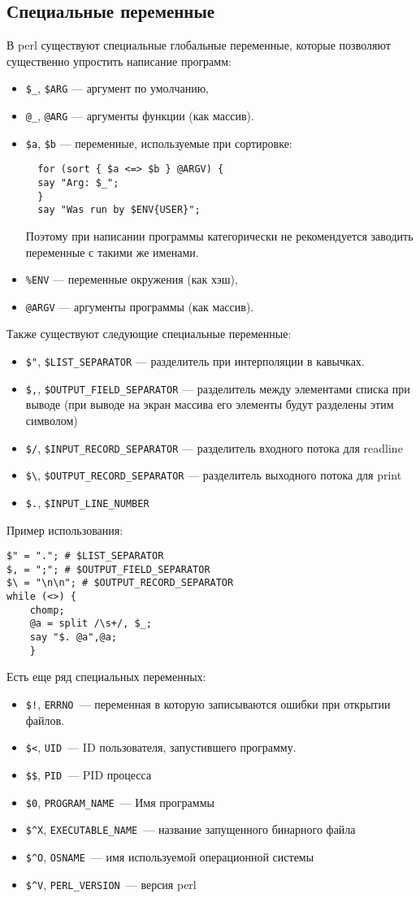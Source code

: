 \subsection{Специальные переменные}
В perl существуют специальные глобальные переменные, которые позволяют существенно упростить написание программ:
\begin{itemize}
  \item \verb|$_|, \verb|$ARG| --- аргумент по умолчанию,
  \item \verb|@_|, \verb|@ARG| --- аргументы функции (как массив).
  \item \verb|$a|, \verb|$b| --- переменные, используемые при сортировке:
  \begin{verbatim}
  for (sort { $a <=> $b } @ARGV) {
  say "Arg: $_";
  }
  say "Was run by $ENV{USER}";
  \end{verbatim}
  Поэтому при написании программы категорически не рекомендуется заводить переменные с такими же именами.
  \item \verb|%ENV| --- переменные окружения (как хэш),
  \item \verb|@ARGV| --- аргументы программы (как массив).
\end{itemize}
Также существуют следующие специальные переменные:
\begin{itemize}
  \item \verb|$"|, \verb|$LIST_SEPARATOR| --- разделитель при интерполяции в кавычках.
  \item \verb|$,|, \verb|$OUTPUT_FIELD_SEPARATOR| --- разделитель между элементами списка при выводе (при выводе на экран массива его элементы будут разделены этим символом)
  \item \verb|$/|, \verb|$INPUT_RECORD_SEPARATOR| --- разделитель входного потока для readline
  \item \verb|$\|, \verb|$OUTPUT_RECORD_SEPARATOR| --- разделитель выходного потока для print
  \item \verb|$.|, \verb|$INPUT_LINE_NUMBER|
\end{itemize}
Пример использования:
\begin{verbatim}
$" = "."; # $LIST_SEPARATOR
$, = ";"; # $OUTPUT_FIELD_SEPARATOR
$\ = "\n\n"; # $OUTPUT_RECORD_SEPARATOR
while (<>) {
    chomp;
    @a = split /\s+/, $_;
    say "$. @a",@a;
    }
\end{verbatim}
Есть еще ряд специальных переменных:
\begin{itemize}
  \item \verb|$!|,  \verb|ERRNO|~--- переменная в которую записываются ошибки при открытии файлов.
  \item \verb|$<|,  \verb|UID|~--- ID пользователя, запустившего программу.
  \item \verb|$$|,  \verb|PID|~--- PID процесса
  \item \verb|$0|,  \verb|PROGRAM_NAME|~--- Имя программы
  \item \verb|$^X|,  \verb|EXECUTABLE_NAME|~--- название запущенного бинарного файла
  \item \verb|$^O|,  \verb|OSNAME|~--- имя используемой операционной системы
  \item \verb|$^V|,  \verb|PERL_VERSION|~--- версия perl
\end{itemize}

